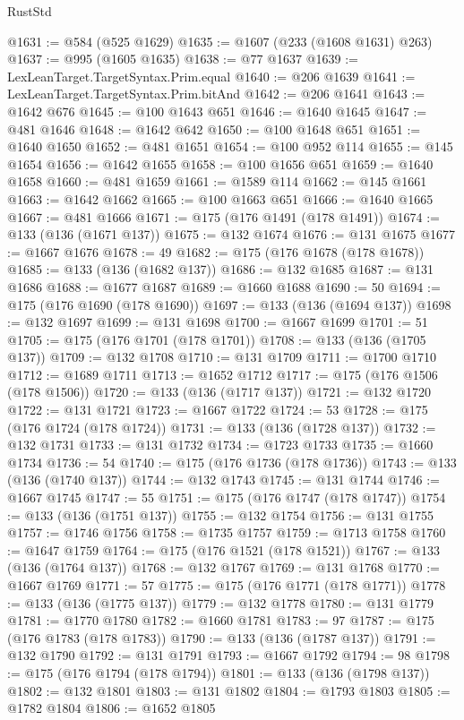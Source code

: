 \begin{lexlean}{RustStd}
\begin{coremodule}
@1631 := @584 (@525 @1629)
@1635 := @1607 (@233 (@1608 @1631) @263)
@1637 := @995 (@1605 @1635)
@1638 := @77 @1637
@1639 := LexLeanTarget.TargetSyntax.Prim.equal
@1640 := @206 @1639
@1641 := LexLeanTarget.TargetSyntax.Prim.bitAnd
@1642 := @206 @1641
@1643 := @1642 @676
@1645 := @100 @1643 @651
@1646 := @1640 @1645
@1647 := @481 @1646
@1648 := @1642 @642
@1650 := @100 @1648 @651
@1651 := @1640 @1650
@1652 := @481 @1651
@1654 := @100 @952 @114
@1655 := @145 @1654
@1656 := @1642 @1655
@1658 := @100 @1656 @651
@1659 := @1640 @1658
@1660 := @481 @1659
@1661 := @1589 @114
@1662 := @145 @1661
@1663 := @1642 @1662
@1665 := @100 @1663 @651
@1666 := @1640 @1665
@1667 := @481 @1666
@1671 := @175 (@176 @1491 (@178 @1491))
@1674 := @133 (@136 (@1671 @137))
@1675 := @132 @1674
@1676 := @131 @1675
@1677 := @1667 @1676
@1678 := 49
@1682 := @175 (@176 @1678 (@178 @1678))
@1685 := @133 (@136 (@1682 @137))
@1686 := @132 @1685
@1687 := @131 @1686
@1688 := @1677 @1687
@1689 := @1660 @1688
@1690 := 50
@1694 := @175 (@176 @1690 (@178 @1690))
@1697 := @133 (@136 (@1694 @137))
@1698 := @132 @1697
@1699 := @131 @1698
@1700 := @1667 @1699
@1701 := 51
@1705 := @175 (@176 @1701 (@178 @1701))
@1708 := @133 (@136 (@1705 @137))
@1709 := @132 @1708
@1710 := @131 @1709
@1711 := @1700 @1710
@1712 := @1689 @1711
@1713 := @1652 @1712
@1717 := @175 (@176 @1506 (@178 @1506))
@1720 := @133 (@136 (@1717 @137))
@1721 := @132 @1720
@1722 := @131 @1721
@1723 := @1667 @1722
@1724 := 53
@1728 := @175 (@176 @1724 (@178 @1724))
@1731 := @133 (@136 (@1728 @137))
@1732 := @132 @1731
@1733 := @131 @1732
@1734 := @1723 @1733
@1735 := @1660 @1734
@1736 := 54
@1740 := @175 (@176 @1736 (@178 @1736))
@1743 := @133 (@136 (@1740 @137))
@1744 := @132 @1743
@1745 := @131 @1744
@1746 := @1667 @1745
@1747 := 55
@1751 := @175 (@176 @1747 (@178 @1747))
@1754 := @133 (@136 (@1751 @137))
@1755 := @132 @1754
@1756 := @131 @1755
@1757 := @1746 @1756
@1758 := @1735 @1757
@1759 := @1713 @1758
@1760 := @1647 @1759
@1764 := @175 (@176 @1521 (@178 @1521))
@1767 := @133 (@136 (@1764 @137))
@1768 := @132 @1767
@1769 := @131 @1768
@1770 := @1667 @1769
@1771 := 57
@1775 := @175 (@176 @1771 (@178 @1771))
@1778 := @133 (@136 (@1775 @137))
@1779 := @132 @1778
@1780 := @131 @1779
@1781 := @1770 @1780
@1782 := @1660 @1781
@1783 := 97
@1787 := @175 (@176 @1783 (@178 @1783))
@1790 := @133 (@136 (@1787 @137))
@1791 := @132 @1790
@1792 := @131 @1791
@1793 := @1667 @1792
@1794 := 98
@1798 := @175 (@176 @1794 (@178 @1794))
@1801 := @133 (@136 (@1798 @137))
@1802 := @132 @1801
@1803 := @131 @1802
@1804 := @1793 @1803
@1805 := @1782 @1804
@1806 := @1652 @1805

\end{coremodule}
\end{lexlean}
